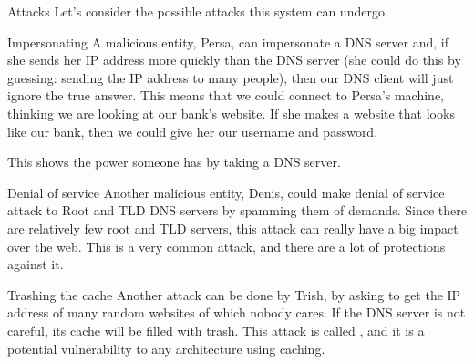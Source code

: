 \documentclass[a4paper]{article}
\begin{document}
\begin{parag}{Attacks}
    Let's consider the possible attacks this system can undergo.

    \begin{subparag}{Impersonating}
        A malicious entity, Persa, can impersonate a DNS server and, if she sends her IP address more quickly than the DNS server (she could do this by guessing: sending the IP address to many people), then our DNS client will just ignore the true answer. This means that we could connect to Persa's machine, thinking we are looking at our bank's website. If she makes a website that looks like our bank, then we could give her our username and password. 

        This shows the power someone has by taking a DNS server.
    \end{subparag}
 
    \begin{subparag}{Denial of service}
        Another malicious entity, Denis, could make denial of service attack to Root and TLD DNS servers by spamming them of demands. Since there are relatively few root and TLD servers, this attack can really have a big impact over the web. This is a very common attack, and there are a lot of protections against it.
    \end{subparag}
    

    \begin{subparag}{Trashing the cache}
        Another attack can be done by Trish, by asking to get the IP address of many random websites of which nobody cares. If the DNS server is not careful, its cache will be filled with trash. This attack is called , and it is a potential vulnerability to any architecture using caching.
    \end{subparag}
\end{parag}
\end{document}

